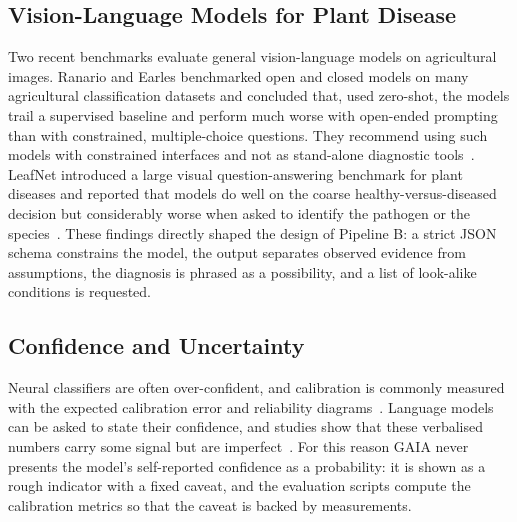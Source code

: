 \subsection{Vision-Language Models for Plant Disease}

Two recent benchmarks evaluate general vision-language models on agricultural images. Ranario and Earles benchmarked open and
closed models on many agricultural classification datasets and concluded that, used zero-shot, the models trail a
supervised baseline and perform much worse with open-ended prompting than with constrained, multiple-choice
questions. They recommend using such models with constrained interfaces and not as stand-alone diagnostic
tools~\cite{ranario2025vlmag}. LeafNet introduced a large visual question-answering benchmark for plant diseases and
reported that models do well on the coarse healthy-versus-diseased decision but considerably worse when asked to identify the
pathogen or the species~\cite{nguyen2026leafnet}. These findings directly shaped the design of Pipeline B: a strict
JSON schema constrains the model, the output separates observed evidence from assumptions, the diagnosis is phrased as a
possibility, and a list of look-alike conditions is requested.

\subsection{Confidence and Uncertainty}

Neural classifiers are often over-confident, and calibration is commonly measured with the expected calibration error
and reliability diagrams~\cite{guo2017calibration}. Language models can be asked to state their confidence, and studies
show that these verbalised numbers carry some signal but are imperfect~\cite{kadavath2022know,xiong2024uncertainty}. For this
reason GAIA never presents the model's self-reported confidence as a probability: it is shown as a rough indicator with
a fixed caveat, and the evaluation scripts compute the calibration metrics so that the caveat is backed by
measurements.

